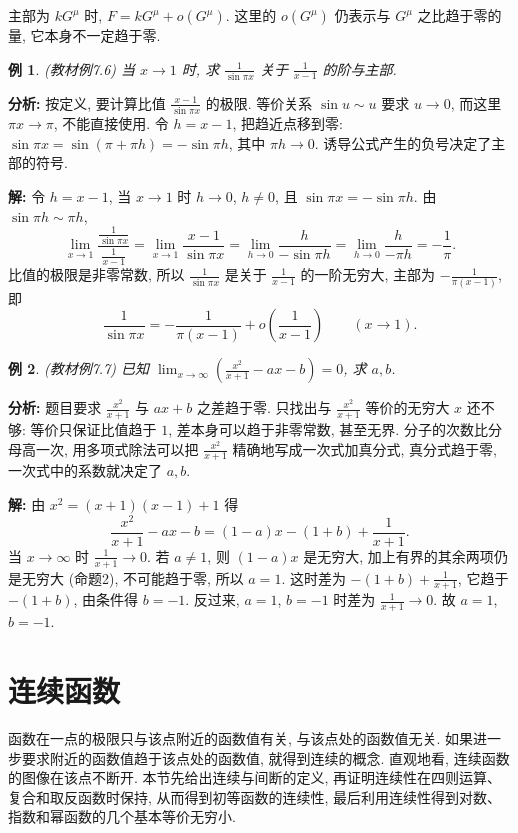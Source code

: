 \documentclass[UTF8,openany]{ctexbook}
\theoremstyle{chinesetextbook}
\newtheorem{example}{例}[section]
\newenvironment{cnsolution}{\par\indent\textbf{解:} \ignorespaces}{\par}
\begin{document}
主部为 $kG^\mu$ 时, $F=kG^\mu+o(G^\mu)$. 这里的 $o(G^\mu)$ 仍表示与 $G^\mu$ 之比趋于零的量, 它本身不一定趋于零.
\begin{example}\label{ex:7-6}
\textnormal{(教材例7.6)} 当 $x\to1$ 时, 求 $\displaystyle\frac1{\sin\pi x}$ 关于 $\displaystyle\frac1{x-1}$ 的阶与主部.
\end{example}
\par\indent\textbf{分析:} 按定义, 要计算比值 $\displaystyle\frac{x-1}{\sin\pi x}$ 的极限. 等价关系 $\sin u\sim u$ 要求 $u\to0$, 而这里 $\pi x\to\pi$, 不能直接使用. 令 $h=x-1$, 把趋近点移到零: $\sin\pi x=\sin(\pi+\pi h)=-\sin\pi h$, 其中 $\pi h\to0$. 诱导公式产生的负号决定了主部的符号.
\begin{cnsolution}
令 $h=x-1$, 当 $x\to1$ 时 $h\to0$, $h\ne0$, 且 $\sin\pi x=-\sin\pi h$. 由 $\sin\pi h\sim\pi h$,
\[
\lim_{x\to1}\frac{\frac1{\sin\pi x}}{\frac1{x-1}}=\lim_{x\to1}\frac{x-1}{\sin\pi x}=\lim_{h\to0}\frac h{-\sin\pi h}=\lim_{h\to0}\frac h{-\pi h}=-\frac1\pi.
\]
比值的极限是非零常数, 所以 $\displaystyle\frac1{\sin\pi x}$ 是关于 $\displaystyle\frac1{x-1}$ 的一阶无穷大, 主部为 $\displaystyle-\frac1{\pi(x-1)}$, 即
\[
\frac1{\sin\pi x}=-\frac1{\pi(x-1)}+o\!\left(\frac1{x-1}\right)\qquad(x\to1).
\]
\end{cnsolution}
\begin{example}
\textnormal{(教材例7.7)} 已知 $\displaystyle\lim_{x\to\infty}\left(\frac{x^2}{x+1}-ax-b\right)=0$, 求 $a,b$.
\end{example}
\par\indent\textbf{分析:} 题目要求 $\displaystyle\frac{x^2}{x+1}$ 与 $ax+b$ 之差趋于零. 只找出与 $\displaystyle\frac{x^2}{x+1}$ 等价的无穷大 $x$ 还不够: 等价只保证比值趋于 $1$, 差本身可以趋于非零常数, 甚至无界. 分子的次数比分母高一次, 用多项式除法可以把 $\displaystyle\frac{x^2}{x+1}$ 精确地写成一次式加真分式, 真分式趋于零, 一次式中的系数就决定了 $a,b$.
\begin{cnsolution}
由 $x^2=(x+1)(x-1)+1$ 得
\[
\frac{x^2}{x+1}-ax-b=(1-a)x-(1+b)+\frac1{x+1}.
\]
当 $x\to\infty$ 时 $\displaystyle\frac1{x+1}\to0$. 若 $a\ne1$, 则 $(1-a)x$ 是无穷大, 加上有界的其余两项仍是无穷大 (命题2), 不可能趋于零, 所以 $a=1$. 这时差为 $\displaystyle-(1+b)+\frac1{x+1}$, 它趋于 $-(1+b)$, 由条件得 $b=-1$. 反过来, $a=1$, $b=-1$ 时差为 $\displaystyle\frac1{x+1}\to0$. 故 $a=1$, $b=-1$.
\end{cnsolution}
\section{连续函数}
函数在一点的极限只与该点附近的函数值有关, 与该点处的函数值无关. 如果进一步要求附近的函数值趋于该点处的函数值, 就得到连续的概念. 直观地看, 连续函数的图像在该点不断开. 本节先给出连续与间断的定义, 再证明连续性在四则运算、复合和取反函数时保持, 从而得到初等函数的连续性, 最后利用连续性得到对数、指数和幂函数的几个基本等价无穷小.
\end{document}
